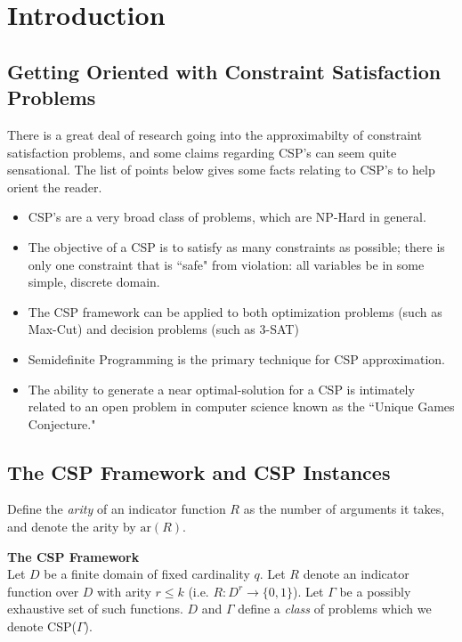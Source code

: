 \section{Introduction}

\subsection{Getting Oriented with Constraint Satisfaction Problems}

There is a great deal of research going into the approximabilty of constraint satisfaction problems, and some claims regarding CSP's can seem quite sensational. 
The list of points below gives some facts relating to CSP's to help orient the reader.

\begin{itemize}
\item CSP's are a very broad class of problems, which are NP-Hard in general.
\item The objective of a CSP is to satisfy as many constraints as possible; there is only one constraint that is ``safe" from violation: all variables be in some simple, discrete domain.
\item The CSP framework can be applied to both optimization problems (such as Max-Cut) and decision problems (such as 3-SAT)
\item Semidefinite Programming is the primary technique for CSP approximation.
\item The ability to generate a near optimal-solution for a CSP is intimately related to an open problem in computer science known as the ``Unique Games Conjecture."
\end{itemize}

\subsection{The CSP Framework and CSP Instances}
Define the \textit{arity} of an indicator function $R$ as the number of arguments it takes, and denote the arity by $\text{ar}(R)$.

\begin{definition}
\textbf{The CSP Framework} \\
Let $D$ be a finite domain of fixed cardinality $q$. 
Let $R$ denote an indicator function over $D$ with arity $r \leq k$ (i.e. $R:D^r \to \{0,1\}$). 
Let $\Gamma$ be a possibly exhaustive set of such functions. 
$D$ and $\Gamma$ define a \textit{class} of problems which we denote CSP($\Gamma$).
\label{def:CSPframework}
\end{definition}

